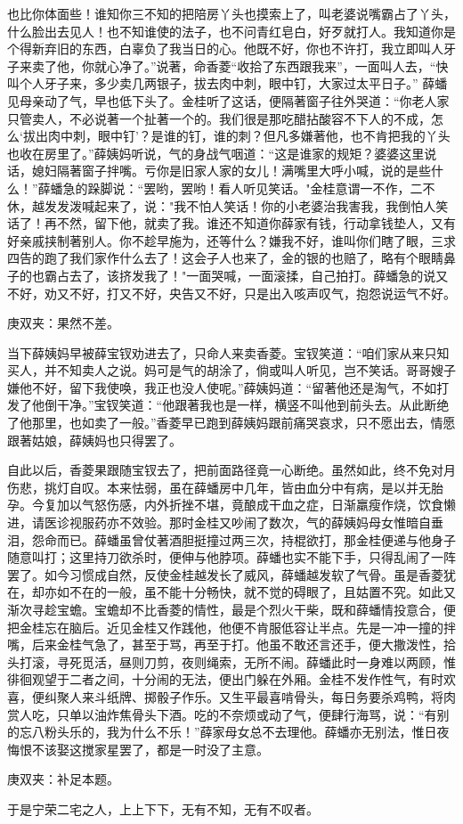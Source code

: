 \begin{parag}
也比你体面些！谁知你三不知的把陪房丫头也摸索上了，叫老婆说嘴霸占了丫头，什么脸出去见人！也不知谁使的法子，也不问青红皂白，好歹就打人。我知道你是个得新弃旧的东西，白辜负了我当日的心。他既不好，你也不许打，我立即叫人牙子来卖了他，你就心净了。”说著，命香菱“收拾了东西跟我来”，一面叫人去，“快叫个人牙子来，多少卖几两银子，拔去肉中刺，眼中钉，大家过太平日子。” 薛蟠见母亲动了气，早也低下头了。金桂听了这话，便隔著窗子往外哭道：“你老人家只管卖人，不必说著一个扯著一个的。我们很是那吃醋拈酸容不下人的不成，怎么‘拔出肉中刺，眼中钉’？是谁的钉，谁的刺？但凡多嫌著他，也不肯把我的丫头也收在房里了。”薛姨妈听说，气的身战气咽道：“这是谁家的规矩？婆婆这里说话，媳妇隔著窗子拌嘴。亏你是旧家人家的女儿！满嘴里大呼小喊，说的是些什么！”薛蟠急的跺脚说：“罢哟，罢哟！看人听见笑话。"金桂意谓一不作，二不休，越发发泼喊起来了，说："我不怕人笑话！你的小老婆治我害我，我倒怕人笑话了！再不然，留下他，就卖了我。谁还不知道你薛家有钱，行动拿钱垫人，又有好亲戚挟制著别人。你不趁早施为，还等什么？嫌我不好，谁叫你们瞎了眼，三求四告的跑了我们家作什么去了！这会子人也来了，金的银的也赔了，略有个眼睛鼻子的也霸占去了，该挤发我了！"一面哭喊，一面滚揉，自己拍打。薛蟠急的说又不好，劝又不好，打又不好，央告又不好，只是出入咳声叹气，抱怨说运气不好。\begin{note}庚双夹：果然不差。\end{note}当下薛姨妈早被薛宝钗劝进去了，只命人来卖香菱。宝钗笑道：“咱们家从来只知买人，并不知卖人之说。妈可是气的胡涂了，倘或叫人听见，岂不笑话。哥哥嫂子嫌他不好，留下我使唤，我正也没人使呢。”薛姨妈道：“留著他还是淘气，不如打发了他倒干净。”宝钗笑道：“他跟著我也是一样，横竖不叫他到前头去。从此断绝了他那里，也如卖了一般。”香菱早已跑到薛姨妈跟前痛哭哀求，只不愿出去，情愿跟著姑娘，薛姨妈也只得罢了。
\end{parag}


\begin{parag}
    自此以后，香菱果跟随宝钗去了，把前面路径竟一心断绝。虽然如此，终不免对月伤悲，挑灯自叹。本来怯弱，虽在薛蟠房中几年，皆由血分中有病，是以并无胎孕。今复加以气怒伤感，内外折挫不堪，竟酿成干血之症，日渐羸瘦作烧，饮食懒进，请医诊视服药亦不效验。那时金桂又吵闹了数次，气的薛姨妈母女惟暗自垂泪，怨命而已。薛蟠虽曾仗著酒胆挺撞过两三次，持棍欲打，那金桂便递与他身子随意叫打；这里持刀欲杀时，便伸与他脖项。薛蟠也实不能下手，只得乱闹了一阵罢了。如今习惯成自然，反使金桂越发长了威风，薛蟠越发软了气骨。虽是香菱犹在，却亦如不在的一般，虽不能十分畅快，就不觉的碍眼了，且姑置不究。如此又渐次寻趁宝蟾。宝蟾却不比香菱的情性，最是个烈火干柴，既和薛蟠情投意合，便把金桂忘在脑后。近见金桂又作践他，他便不肯服低容让半点。先是一冲一撞的拌嘴，后来金桂气急了，甚至于骂，再至于打。他虽不敢还言还手，便大撒泼性，拾头打滚，寻死觅活，昼则刀剪，夜则绳索，无所不闹。薛蟠此时一身难以两顾，惟徘徊观望于二者之间，十分闹的无法，便出门躲在外厢。金桂不发作性气，有时欢喜，便纠聚人来斗纸牌、掷骰子作乐。又生平最喜啃骨头，每日务要杀鸡鸭，将肉赏人吃，只单以油炸焦骨头下酒。吃的不奈烦或动了气，便肆行海骂，说：“有别的忘八粉头乐的，我为什么不乐！”薛家母女总不去理他。薛蟠亦无别法，惟日夜悔恨不该娶这搅家星罢了，都是一时没了主意。\begin{note}庚双夹：补足本题。\end{note}于是宁荣二宅之人，上上下下，无有不知，无有不叹者。
\end{parag}


